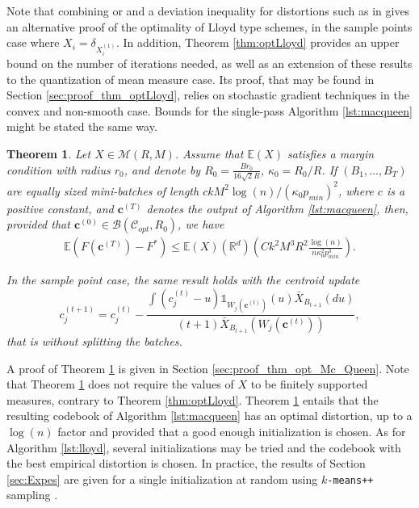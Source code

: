 \documentclass[noinfoline,preprint]{article}
\newtheorem{theorem}{Theorem}
\newcommand{\cb}{\mathbf{c}}
\newcommand{\R}{\mathbb{R}}
\newcommand{\E}{\mathbb{E}}
\renewcommand{\1}{\mathds 1}
\begin{document}
 Note that combining \cite[Theorem 3]{Levrard18} or \cite{Monteleoni16} and a deviation inequality for distortions such as in \cite{Levrard15} gives an alternative proof of the optimality of Lloyd type schemes, in the sample points case where $X_i=\delta_{X_i^{(1)}}$. In addition, Theorem \ref{thm:optLloyd} provides an upper bound on the number of iterations needed, as well as an extension of these results to the quantization of mean measure case. Its proof, that may be found in Section \ref{sec:proof_thm_optLloyd}, relies on stochastic gradient techniques in the convex and non-smooth case.
Bounds for the single-pass Algorithm \ref{lst:macqueen} might be stated the same way.
\begin{theorem}\label{thm:opt_Mc_Queen}
Let $X \in \mathcal{M}(R,M)$. Assume that $\E(X)$ satisfies a margin condition with radius $r_0$, and denote by $R_0= \frac{Br_0}{16\sqrt{2}R}$, $\kappa_0 = R_0/R$. If $(B_1, \hdots, B_T)$ are equally sized mini-batches of length $c k M^2\log(n)/(\kappa_0 p_{min})^2$, where $c$ is a positive constant, and $\cb^{(T)}$ denotes the output of Algorithm \ref{lst:macqueen}, then, provided that $\cb^{(0)} \in \mathcal{B}(\mathcal{C}_{opt},R_0)$, we have
\begin{align*}
\mathbb{E} \left ( F(\cb^{(T)}) - F^* \right ) \leq \E(X)(\R^d) \left ( C k^2 M^3 R^2 \frac{\log(n)}{n \kappa_0^2 p_{min}^3} \right ).
\end{align*}

In the sample point case, the same result holds with the centroid update
\[
c^{(t+1)}_j=  c_j^{(t)} - \frac{ \int (c_j^{(t)} - u) \1_{W_j(\cb^{(t)})}(u) \bar{X}_{B_{t+1}}(du)}{(t+1)\bar{X}_{B_{t+1}}  \left ( W_j(\cb^{(t)})  \right )} ,
\]
that is without splitting the batches.
\end{theorem} 
A proof of Theorem \ref{thm:opt_Mc_Queen} is given in Section \ref{sec:proof_thm_opt_Mc_Queen}. Note that Theorem \ref{thm:opt_Mc_Queen} does not require the values of $X$ to be finitely supported measures, contrary to Theorem \ref{thm:optLloyd}.  Theorem \ref{thm:opt_Mc_Queen} entails that the resulting codebook of Algorithm \ref{lst:macqueen} has an optimal distortion, up to a $\log(n)$ factor and provided that a good enough initialization is chosen. As for Algorithm \ref{lst:lloyd}, several initializations may be tried and the codebook with the best empirical distortion is chosen. In practice, the results of Section \ref{sec:Expes} are given for a single initialization at random using \texttt{$k$-means++} sampling \cite{Arthur07}.
\end{document}
